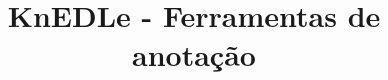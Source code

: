 \documentclass[brazil,14]{beamer}
\newenvironment{itemizespc}{
\begin{itemize}
  \setlength{\itemsep}{15pt}
}{\end{itemize}}
\begin{document}
\title{KnEDLe - Ferramentas de anotação}











\end{document}
